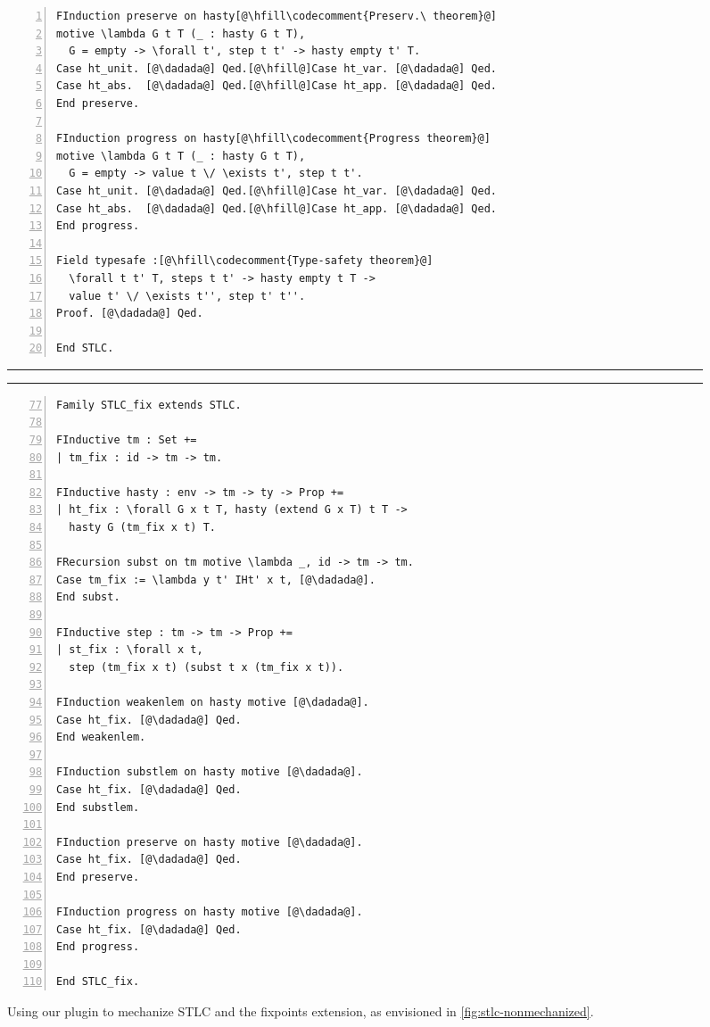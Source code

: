 \begin{figure}
\begin{minipage}{\textwidth}
\begin{multicols}{2}
\begin{lstlisting}[numbers=left]
FInduction preserve on hasty[@\hfill\codecomment{Preserv.\ theorem}@]
motive \lambda G t T (_ : hasty G t T),
  G = empty -> \forall t', step t t' -> hasty empty t' T.
Case ht_unit. [@\dadada@] Qed.[@\hfill@]Case ht_var. [@\dadada@] Qed.
Case ht_abs.  [@\dadada@] Qed.[@\hfill@]Case ht_app. [@\dadada@] Qed.
End preserve.

FInduction progress on hasty[@\hfill\codecomment{Progress theorem}@]
motive \lambda G t T (_ : hasty G t T),
  G = empty -> value t \/ \exists t', step t t'.
Case ht_unit. [@\dadada@] Qed.[@\hfill@]Case ht_var. [@\dadada@] Qed.
Case ht_abs.  [@\dadada@] Qed.[@\hfill@]Case ht_app. [@\dadada@] Qed.
End progress.

Field typesafe :[@\hfill\codecomment{Type-safety theorem}@]
  \forall t t' T, steps t t' -> hasty empty t T ->
  value t' \/ \exists t'', step t' t''.
Proof. [@\dadada@] Qed.

End STLC.
\end{lstlisting}
\medskip

\hrule
\hrule
\medskip

\begin{lstlisting}[numbers=left,firstnumber=77]
Family STLC_fix extends STLC.

FInductive tm : Set +=
| tm_fix : id -> tm -> tm.

FInductive hasty : env -> tm -> ty -> Prop +=
| ht_fix : \forall G x t T, hasty (extend G x T) t T ->
  hasty G (tm_fix x t) T.

FRecursion subst on tm motive \lambda _, id -> tm -> tm.
Case tm_fix := \lambda y t' IHt' x t, [@\dadada@].
End subst.

FInductive step : tm -> tm -> Prop +=
| st_fix : \forall x t,
  step (tm_fix x t) (subst t x (tm_fix x t)).

FInduction weakenlem on hasty motive [@\dadada@].
Case ht_fix. [@\dadada@] Qed.
End weakenlem.

FInduction substlem on hasty motive [@\dadada@].
Case ht_fix. [@\dadada@] Qed.
End substlem.

FInduction preserve on hasty motive [@\dadada@].
Case ht_fix. [@\dadada@] Qed.
End preserve.

FInduction progress on hasty motive [@\dadada@].
Case ht_fix. [@\dadada@] Qed.
End progress.

End STLC_fix.
\end{lstlisting}

\end{multicols}
\end{minipage}
\caption{Using our plugin to mechanize STLC and the fixpoints extension,
as envisioned in \cref{fig:stlc-nonmechanized}.}
\label{fig:stlc-mechanized}
\end{figure}




